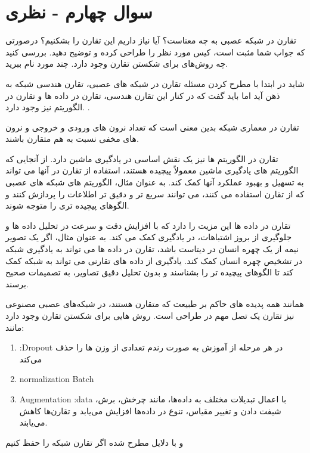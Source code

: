\section{سوال چهارم - نظری}
تقارن در شبکه عصبی به چه معناست؟ آیا نیاز داریم این تقارن را بشکنیم؟ درصورتی که جواب شما مثبت است، کیس مورد نظر را طراحی کرده و توضیح دهید. بررسی کنید چه روش‌های برای شکستن تقارن وجود دارد. چند مورد نام ببرید.





\begin{qsolve}
 	شاید در ابتدا با مطرح کردن مسئله تقارن در شبکه های عصبی، تقارن هندسی شبکه به ذهن آید اما باید گفت که در کنار این تقارن هندسی، تقارن در داده ها و تقارن در الگوریتم نیز وجود دارد. \cite{ref1}.
 	
 	تقارن در معماری شبکه بدین معنی است که تعداد نرون های ورودی و خروجی و نرون های مخفی نسبت به هم متقارن باشند. 
 	
 	تقارن در الگوریتم ها نیز یک نقش اساسی در یادگیری ماشین دارد. از آنجایی که الگوریتم های یادگیری ماشین معمولاً پیچیده هستند، استفاده از تقارن در آنها می تواند به تسهیل و بهبود عملکرد آنها کمک کند. به عنوان مثال، الگوریتم های شبکه های عصبی که از تقارن استفاده می کنند، می توانند سریع تر و دقیق تر اطلاعات را پردازش کنند و الگوهای پیچیده تری را متوجه شوند.
 	
 	تقارن در داده ها این مزیت را دارد که با افزایش دقت و سرعت در تحلیل داده ها و جلوگیری از بروز اشتباهات، در یادگیری کمک می کند. به عنوان مثال، اگر یک تصویر نیمه از یک چهره انسان در دیتاست باشد، تقارن در داده ها می تواند به یادگیری شبکه در تشخیص چهره انسان کمک کند. یادگیری از داده های تقارنی می تواند به شبکه کمک کند تا الگوهای پیچیده تر را بشناسند و بدون تحلیل دقیق تصاویر، به تصمیمات صحیح برسند.
 	
 	
همانند همه پدیده های حاکم بر طبیعت که متقارن هستند، در شبکه‌های عصبی مصنوعی نیز تقارن یک تصل مهم در طراحی است. روش هایی برای شکستن تقارن وجود دارد مانند:

\begin{enumerate}
	\item :Dropout در هر مرحله از آموزش به صورت رندم تعدادی از وزن ها را حذف می‌کند
	
	\item normalization Batch
	
	\item Augmentation :data  با اعمال تبدیلات مختلف به داده‌ها، مانند چرخش، برش، شیفت دادن و تغییر مقیاس، تنوع در داده‌ها افزایش می‌یابد و تقارن‌ها کاهش می‌یابند.
\end{enumerate}
 و با دلایل مطرح شده اگر تقارن شبکه را حفظ کنیم


\end{qsolve}

















